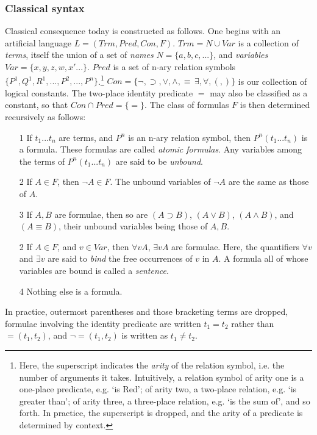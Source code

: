 \documentclass[]{article}
\begin{document}
\subsubsection{Classical syntax}
Classical consequence today is constructed as follows. 
One begins with an artificial language $L = (Trm, Pred, Con, F)$. 
$Trm = N \cup Var$ is a collection of \textit{terms}, 
itself the union of a set of \textit{names} $N = \{a, b, c, ...\}$, 
and \textit{variables} $Var = \{x, y, z, w, x'...\}$. 
$Pred$ is a set of n-ary relation symbols $\{P^{1}, Q^{1}, R^{1},..., P^{2},..., P^{n}\}$.\footnote{Here, the superscript indicates the \textit{arity} of the relation symbol, 
	i.e. the number of arguments it takes. 
	Intuitively, 
	a relation symbol of arity one is a one-place predicate, 
	e.g. `is Red'; 
	of arity two, 
	a two-place relation, 
	e.g. `is greater than'; 
	of arity three, 
	a three-place relation, 
	e.g. `is the sum of', 
	and so forth. 
	In practice, the superscript is dropped, 
	and the arity of a predicate is determined by context.} 
$Con = \{\neg, \supset, \vee, \wedge, \equiv\, \exists, \forall, (, )\}$ is our collection of logical constants.
The two-place identity predicate $=$ may also be classified as a constant, 
so that $Con \cap Pred = \{=\}$. 
The class of formulas $F$ is then determined recursively as follows:
\begin{itemize}
\item[1] If $t_{1} ... t_{n}$ are terms, 
and $P^{n}$ is an n-ary relation symbol, 
then $P^{n}(t_{1} ... t_{n})$ is a formula. 
These formulas are called \textit{atomic formulas}. 
Any variables among the terms of $P^{n}(t_{1} ... t_{n})$ are said to be \textit{unbound}.
\item[2] If $A \in F$, then $\neg A \in F$. The unbound variables of $\neg A$ are the same as those of $A$.
\item[3] If $A, B$ are formulae, then so are $(A \supset B)$, $(A \vee B)$, $(A \wedge B)$, and $(A \equiv B)$, their unbound variables being those of $A, B$.
\item[2] If $A \in F$, and $v \in Var$, then $\forall v A$, $\exists v A$ are formulae. Here, the quantifiers $\forall v$ and $\exists v$ are said to \textit{bind} the free occurrences of $v$ in $A$. A formula all of whose variables are bound is called a \textit{sentence}.
\item[4] Nothing else is a formula.
\end{itemize}
In practice, outermost parentheses and those bracketing terms are dropped, formulae involving the identity predicate are written $t_{1} = t_{2}$ rather than $=(t_{1}, t_{2})$, and $\neg=(t_{1}, t_{2})$ is written as $t_{1} \ne t_{2}$.
\end{document}
